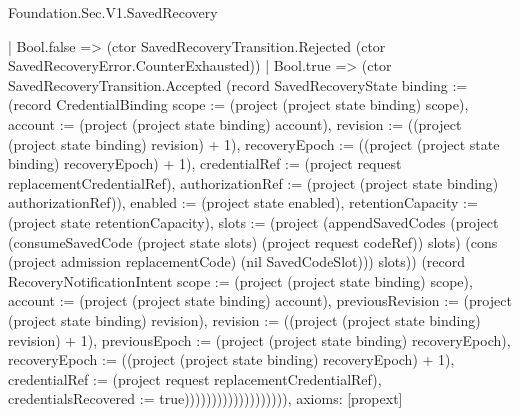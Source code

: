 \begin{lexlean}{Foundation.Sec.V1.SavedRecovery}
\begin{semanticmodule}
{                                    | Bool.false => (ctor SavedRecoveryTransition.Rejected (ctor SavedRecoveryError.CounterExhausted))
                                    | Bool.true => (ctor SavedRecoveryTransition.Accepted (record SavedRecoveryState {binding := (record CredentialBinding {scope := (project (project state binding) scope), account := (project (project state binding) account), revision := ((project (project state binding) revision) + 1), recoveryEpoch := ((project (project state binding) recoveryEpoch) + 1), credentialRef := (project request replacementCredentialRef), authorizationRef := (project (project state binding) authorizationRef)}), enabled := (project state enabled), retentionCapacity := (project state retentionCapacity), slots := (project (appendSavedCodes (project (consumeSavedCode (project state slots) (project request codeRef)) slots) (cons (project admission replacementCode) (nil SavedCodeSlot))) slots)}) (record RecoveryNotificationIntent {scope := (project (project state binding) scope), account := (project (project state binding) account), previousRevision := (project (project state binding) revision), revision := ((project (project state binding) revision) + 1), previousEpoch := (project (project state binding) recoveryEpoch), recoveryEpoch := ((project (project state binding) recoveryEpoch) + 1), credentialRef := (project request replacementCredentialRef), credentialsRecovered := true}))))))))))))))))))),
  axioms: [propext]
}


\end{semanticmodule}
\end{lexlean}
